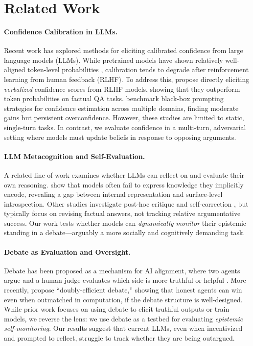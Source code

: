 \documentclass{article}
\begin{document}
\section{Related Work}

\paragraph{Confidence Calibration in LLMs.}
Recent work has explored methods for eliciting calibrated confidence from large language models (LLMs). While pretrained models have shown relatively well-aligned token-level probabilities \citep{kadavath2022know}, calibration tends to degrade after reinforcement learning from human feedback (RLHF). To address this, \citet{tian2023justask} propose directly eliciting \textit{verbalized} confidence scores from RLHF models, showing that they outperform token probabilities on factual QA tasks. \citet{xiong2024uncertainty} benchmark black-box prompting strategies for confidence estimation across multiple domains, finding moderate gains but persistent overconfidence. However, these studies are limited to static, single-turn tasks. In contrast, we evaluate confidence in a multi-turn, adversarial setting where models must update beliefs in response to opposing arguments.

\paragraph{LLM Metacognition and Self-Evaluation.}
A related line of work examines whether LLMs can reflect on and evaluate their own reasoning. \citet{song2025introspect} show that models often fail to express knowledge they implicitly encode, revealing a gap between internal representation and surface-level introspection. Other studies investigate post-hoc critique and self-correction \cite{Li2024ConfidenceMR}, but typically focus on revising factual answers, not tracking relative argumentative success. Our work tests whether models can \textit{dynamically monitor} their epistemic standing in a debate—arguably a more socially and cognitively demanding task.

\paragraph{Debate as Evaluation and Oversight.}
Debate has been proposed as a mechanism for AI alignment, where two agents argue and a human judge evaluates which side is more truthful or helpful \citep{irving2018debate}. More recently, \citet{browncohen2023debate} propose ``doubly-efficient debate,'' showing that honest agents can win even when outmatched in computation, if the debate structure is well-designed. While prior work focuses on using debate to elicit truthful outputs or train models, we reverse the lens: we use debate as a testbed for evaluating \textit{epistemic self-monitoring}. Our results suggest that current LLMs, even when incentivized and prompted to reflect, struggle to track whether they are being outargued.
\end{document}
